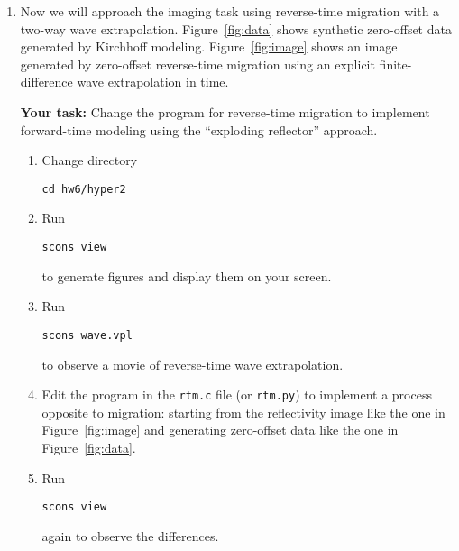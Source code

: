 \begin{enumerate}




\lstset{language=python,numbers=left,numberstyle=\tiny,showstringspaces=false}


\item Now we will approach the imaging
  task using reverse-time migration with a two-way wave
  extrapolation. Figure~\ref{fig:data} shows synthetic zero-offset
  data generated by Kirchhoff modeling. Figure~\ref{fig:image} shows
  an image generated by zero-offset reverse-time migration using an
  explicit finite-difference wave extrapolation in time.

   \textbf{Your task:} Change the program for reverse-time migration to
  implement forward-time modeling using the ``exploding reflector''
  approach.

    \begin{enumerate}
    \item Change directory 
\begin{verbatim}
cd hw6/hyper2
\end{verbatim}
    \item Run
\begin{verbatim}
scons view
\end{verbatim}
      to generate figures and display them on your screen.
  \item Run
\begin{verbatim}
scons wave.vpl
\end{verbatim}
      to observe a movie of reverse-time wave extrapolation.
    \item Edit the program in the \texttt{rtm.c} file (or
      \texttt{rtm.py}) to implement a process opposite to migration: starting from the reflectivity image like the one in Figure~\ref{fig:image} and generating zero-offset data like the one in Figure~\ref{fig:data}. 
    \item Run
\begin{verbatim}
scons view
\end{verbatim}
      again to observe the differences.
    \end{enumerate}
 

\end{enumerate}
